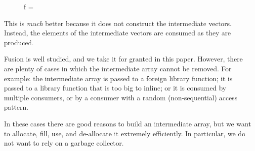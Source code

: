 \begin{figure}[H]
\hfill\begin{minipage}{.95\textwidth}\raggedright
f = 
\\
\tabt {}
\end{minipage}\hfill
\end{figure}
\noindent
This is \emph{much} better because it does not construct the intermediate vectors. Instead, the elements of the intermediate vectors are consumed as they are produced.

Fusion is well studied, and we take it for granted in this paper.  However, there are plenty of cases in which the intermediate array cannot be removed. For example: the intermediate array is passed to a foreign library function;  it is passed to a library function that is too big to inline; or it is consumed by multiple consumers, or by a consumer with a random (non-sequential) access pattern.  

In these cases there are good reasons to build an intermediate array, but we want to allocate, fill, use, and de-allocate it extremely efficiently.  In particular, we do not want to rely on a garbage collector.




